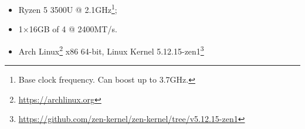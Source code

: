\begin{itemize}
  \item {}\label{acro:AMD} Ryzen\textsuperscript{\texttrademark} 5 3500U
  \label{acro:CPU} @ 2.1GHz\footnote{Base clock frequency.  Can boost
  up to 3.7GHz.};
  \item 1×16GB \label{acro:SO-DIMM} of \label{acro:DDR}4
  \label{acro:RAM} @ 2400MT/s.
  \item Arch
  Linux\textsuperscript{\texttrademark}\footnote{\url{https://archlinux.org}}
  x86 64-bit, Linux{\textregistered} Kernel
  5.12.15-zen1\footnote{\url{https://github.com/zen-kernel/zen-kernel/tree/v5.12.15-zen1}}
\end{itemize}
\clearpage






